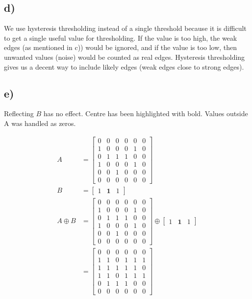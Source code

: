 \subsection*{d)}
We use hysteresis thresholding instead of a single threshold because it is difficult to get a single useful value for thresholding. If the value is too high, the weak edges (as mentioned in c)) would be ignored, and if the value is too low, then unwanted values (noise) would be counted as real edges. Hysteresis thresholding gives us a decent way to include likely edges (weak edges close to strong edges). 

\subsection*{e)}
Reflecting $B$ has no effect. Centre has been highlighted with bold. Values outside A was handled as zeros. 

\begin{align*}
    A &= \begin{bmatrix}
        0 & 0 & 0 & 0 & 0 & 0 \\
        1 & 0 & 0 & 0 & 1 & 0 \\ 
        0 & 1 & 1 & 1 & 0 & 0 \\ 
        1 & 0 & 0 & 0 & 1 & 0 \\ 
        0 & 0 & 1 & 0 & 0 & 0 \\ 
        0 & 0 & 0 & 0 & 0 & 0 
    \end{bmatrix} \\ 
    B &= \begin{bmatrix}
        1 & \mathbf{1} & 1
    \end{bmatrix} \\ 
    A \oplus B &= \begin{bmatrix}
        0 & 0 & 0 & 0 & 0 & 0 \\
        1 & 0 & 0 & 0 & 1 & 0 \\ 
        0 & 1 & 1 & 1 & 0 & 0 \\ 
        1 & 0 & 0 & 0 & 1 & 0 \\ 
        0 & 0 & 1 & 0 & 0 & 0 \\ 
        0 & 0 & 0 & 0 & 0 & 0 
    \end{bmatrix} \oplus \begin{bmatrix}
        1 & \mathbf{1} & 1
    \end{bmatrix} \\ 
    &= \begin{bmatrix}
        0 & 0 & 0 & 0 & 0 & 0 \\
        1 & 1 & 0 & 1 & 1 & 1 \\
        1 & 1 & 1 & 1 & 1 & 0 \\ 
        1 & 1 & 0 & 1 & 1 & 1 \\ 
        0 & 1 & 1 & 1 & 0 & 0 \\ 
        0 & 0 & 0 & 0 & 0 & 0 
    \end{bmatrix}
\end{align*}
